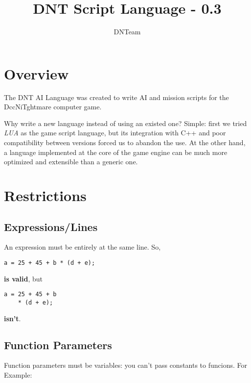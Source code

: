 \documentclass[ letterpaper,12pt]{article}
\begin{document}
\title{\textbf{DNT Script Language - 0.3}}

\author
{
DNTeam
}

\maketitle

\newpage

\tableofcontents

\newpage

\section{Overview}

   The DNT AI Language was created to write AI and mission scripts for the
DccNiTghtmare computer game. 

   Why write a new language instead of using an existed one? Simple: first we
tried {\it LUA} as the game script language, but its integration with C++ and
poor compatibility between versions forced us to abandon the use. At the other
hand, a language implemented at the core of the game engine can be much more
optimized and extensible than a generic one.

\section{Restrictions}

\subsection{Expressions/Lines}
An expression must be entirely at the same line. So,

\begin{verbatim}
a = 25 + 45 + b * (d + e);
\end{verbatim}

{\bf is valid}, but

\begin{verbatim}
a = 25 + 45 + b 
    * (d + e);
\end{verbatim}

{\bf isn't}.

\subsection{Function Parameters}

Function parameters must be variables: you can't pass constants to funcions.
For Example:
\end{document}

